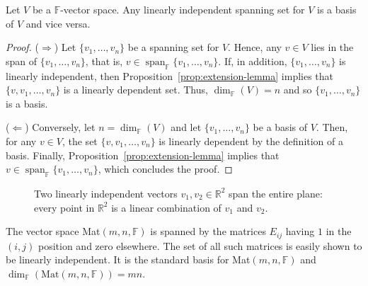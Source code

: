 		\begin{proposition}
			\label{prop:v-basis}
			Let $V$ be a $\mathbb{F}$-vector space. Any linearly independent spanning set for $V$ is a basis of $V$ and vice versa.
		\end{proposition}
		
		\begin{proof}
			($\Rightarrow$) Let $\{v_1, \dots, v_n\}$ be a spanning set for $V$. Hence, any $v \in V$ lies in the span of $\{v_1, \dots, v_n\}$, that is, $v \in \operatorname{span}_{\mathbb{F}}\{v_1, \dots, v_n\}$. If, in addition, $\{v_1, \dots, v_n\}$ is linearly independent, then Proposition~\ref{prop:extension-lemma} implies that $\{v, v_1, \dots, v_n\}$ is a linearly dependent set. Thus, $\dim_{\mathbb{F}}(V) = n$ and so $\{v_1, \dots, v_n\}$ is a basis.
			
			($\Leftarrow$) Conversely, let $n = \dim_{\mathbb{F}}(V)$ and let $\{v_1, \dots, v_n\}$ be a basis of $V$. Then, for any $v \in V$, the set $\{v, v_1, \dots, v_n\}$ is linearly dependent by the definition of a basis. Finally, Proposition~\ref{prop:extension-lemma} implies that $v \in \operatorname{span}_{\mathbb{F}}\{v_1, \dots, v_n\}$, which concludes the proof.
		\end{proof}
		
		\begin{figure}[h]
			\centering
			\caption{Two linearly independent vectors $v_1,v_2\in\mathbb{R}^2$ span the entire plane: every point in $\mathbb{R}^2$ is a linear combination of $v_1$ and $v_2$.}
			\label{fig:basis-span}
		\end{figure}
		
		\begin{example}
			The vector space Mat$(m,n,\mathbb{F})$ is spanned by the matrices $E_{ij}$ having $1$ in the $(i,j)$ position and zero elsewhere. The set of all such matrices is easily shown to be linearly independent. It is the standard basis for Mat$(m,n,\mathbb{F})$ and $\dim_{\mathbb{F}}(\text{Mat}(m,n,\mathbb{F})) = mn$.
		\end{example}
		
